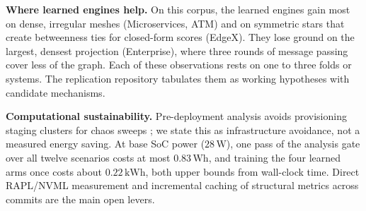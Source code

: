\documentclass[preprint,3p]{elsarticle}
\begin{document}
\begin{table}[htbp]
\centering
\small
\caption{How the instruments in the SaG portfolio are best used, given the evidence in Section~\ref{sec:7}.}
\label{tab:guidance}
\end{table}

\noindent\textbf{Where learned engines help.} On this corpus, the learned engines gain most on dense, irregular meshes (Microservices, ATM) and on symmetric stars that create betweenness ties for closed-form scores (EdgeX). They lose ground on the largest, densest projection (Enterprise), where three rounds of message passing cover less of the graph. Each of these observations rests on one to three folds or systems. The replication repository tabulates them as working hypotheses with candidate mechanisms.

\noindent\textbf{Computational sustainability.} Pre-deployment analysis avoids provisioning staging clusters for chaos sweeps \cite{calero2015green,verdecchia2023greenai}; we state this as infrastructure avoidance, not a measured energy saving. At base SoC power ($28\,\text{W}$), one pass of the analysis gate over all twelve scenarios costs at most $0.83\,\text{Wh}$, and training the four learned arms once costs about $0.22\,\text{kWh}$, both upper bounds from wall-clock time. Direct RAPL/NVML measurement \cite{lannelongue2021green,schmidt2021codecarbon} and incremental caching of structural metrics across commits are the main open levers.
\end{document}
